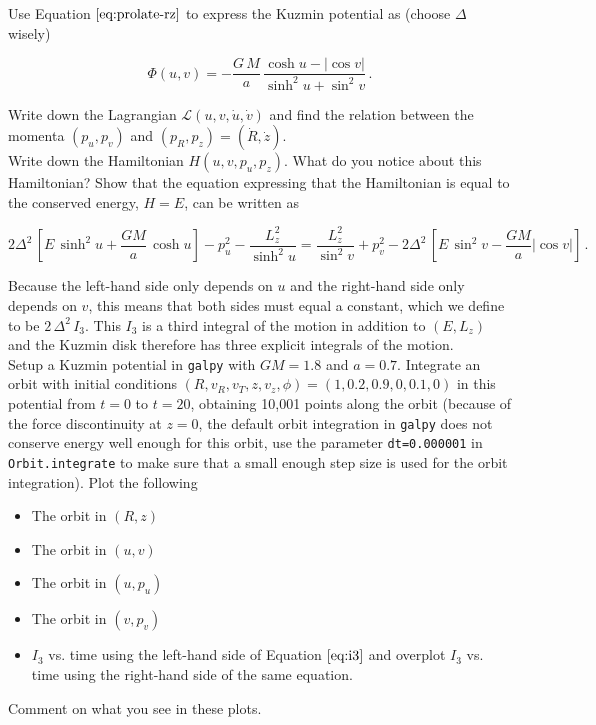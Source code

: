 \documentclass[12pt]{article}
\begin{document}
 Use Equation $\eqref{eq:prolate-rz}$ to express the
Kuzmin potential as (choose $\Delta$ wisely)

\begin{equation}
  \Phi(u,v) = -\frac{G\,M}{a}\,\frac{\cosh u - |\cos v|}{\sinh^2 u + \sin^2 v}\,.
\end{equation}

 Write down the Lagrangian
$\mathcal{L}(u,v,\dot{u},\dot{v})$ and find the relation between the
momenta $(p_u,p_v)$ and $(p_R,p_z) = (\dot{R},\dot{z})$.\\

 Write down the Hamiltonian $H(u,v,p_u,p_z)$. What
do you notice about this Hamiltonian? Show that the equation
expressing that the Hamiltonian is equal to the conserved energy,
$H=E$, can be written as

\begin{equation}\label{eq:i3}
  2\Delta^2\,\left[E\,\sinh^2 u + \frac{GM}{a}\,\cosh u\right] -p_u^2-\frac{L_z^2}{\sinh^2 u} = \frac{L_z^2}{\sin^2 v}+p_v^2-2\Delta^2\,\left[E\,\sin^2 v -\frac{GM}{a} |\cos v|\right]\,.
\end{equation}

Because the left-hand side only depends on $u$ and the right-hand side
only depends on $v$, this means that both sides must equal a constant,
which we define to be $2\,\Delta^2\,I_3$. This $I_3$ is a third
integral of the motion in addition to $(E,L_z)$ and the Kuzmin disk
therefore has three explicit integrals of the motion.\\

 Setup a Kuzmin potential in \texttt{galpy} with $GM
= 1.8$ and $a = 0.7$. Integrate an orbit with initial conditions
$(R,v_R,v_T,z,v_z,\phi) = (1,0.2,0.9,0,0.1,0)$ in this potential from
$t=0$ to $t=20$, obtaining 10,001 points along the orbit (because of
the force discontinuity at $z=0$, the default orbit integration in
\texttt{galpy} does not conserve energy well enough for this orbit,
use the parameter \texttt{dt=0.000001} in \texttt{Orbit.integrate} to
make sure that a small enough step size is used for the orbit
integration). Plot the following
\begin{itemize}
\item The orbit in $(R,z)$
\item The orbit in $(u,v)$
\item The orbit in $(u,p_u)$
\item The orbit in $(v,p_v)$
\item $I_3$ vs. time using the left-hand side of Equation
  $\eqref{eq:i3}$ and overplot $I_3$ vs. time using the right-hand
  side of the same equation.
\end{itemize}

Comment on what you see in these plots.
\end{document}
